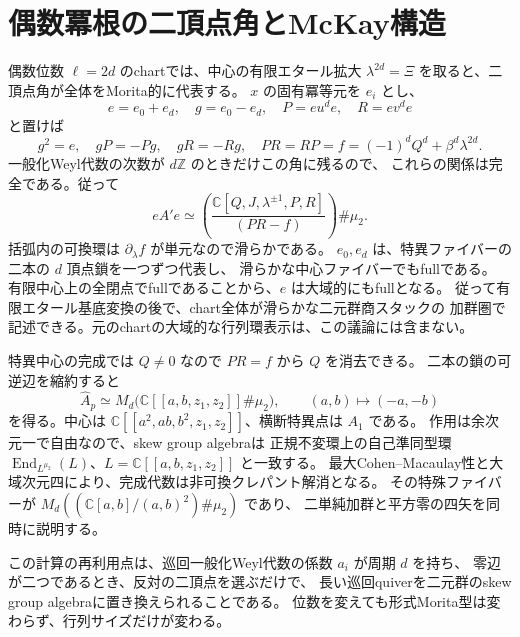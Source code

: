 \section{偶数冪根の二頂点角とMcKay構造}
\label{sec:notes-root-McKay-v38}

偶数位数 $\ell=2d$ のchartでは、中心の有限エタール拡大
$\lambda^{2d}=\Xi$ を取ると、二頂点角が全体をMorita的に代表する。
$x$ の固有冪等元を $e_i$ とし、
\[
 e=e_0+e_d,\quad g=e_0-e_d,\quad P=eu^de,\quad R=ev^de
\]
と置けば
\[
 g^2=e,\quad gP=-Pg,\quad gR=-Rg,\quad
 PR=RP=f=(-1)^dQ^d+\beta^d\lambda^{2d}.
\]
一般化Weyl代数の次数が $d\mathbb Z$ のときだけこの角に残るので、
これらの関係は完全である。従って
\[
 eA'e\simeq
 \left(\frac{\mathbb C[Q,J,\lambda^{\pm1},P,R]}{(PR-f)}\right)\#\mu_2.
\]
括弧内の可換環は $\partial_\lambda f$ が単元なので滑らかである。
$e_0,e_d$ は、特異ファイバーの二本の $d$ 頂点鎖を一つずつ代表し、
滑らかな中心ファイバーでもfullである。
有限中心上の全閉点でfullであることから、$e$ は大域的にもfullとなる。
従って有限エタール基底変換の後で、chart全体が滑らかな二元群商スタックの
加群圏で記述できる。元のchartの大域的な行列環表示は、この議論には含まない。

特異中心の完成では $Q\ne0$ なので $PR=f$ から $Q$ を消去できる。
二本の鎖の可逆辺を縮約すると
\[
 \widehat A_p\simeq
 M_d\bigl(\mathbb C[[a,b,z_1,z_2]]\#\mu_2\bigr),
 \qquad (a,b)\longmapsto(-a,-b)
\]
を得る。中心は
$\mathbb C[[a^2,ab,b^2,z_1,z_2]]$、横断特異点は $A_1$ である。
作用は余次元一で自由なので、skew group algebraは
正規不変環上の自己準同型環
$\operatorname{End}_{L^{\mu_2}}(L)$、$L=\mathbb C[[a,b,z_1,z_2]]$ と一致する。
最大Cohen--Macaulay性と大域次元四により、完成代数は非可換クレパント解消となる。
その特殊ファイバーが
$M_d((\mathbb C[a,b]/(a,b)^2)\#\mu_2)$ であり、
二単純加群と平方零の四矢を同時に説明する。

この計算の再利用点は、巡回一般化Weyl代数の係数 $a_i$ が周期 $d$ を持ち、
零辺が二つであるとき、反対の二頂点を選ぶだけで、
長い巡回quiverを二元群のskew group algebraに置き換えられることである。
位数を変えても形式Morita型は変わらず、行列サイズだけが変わる。

